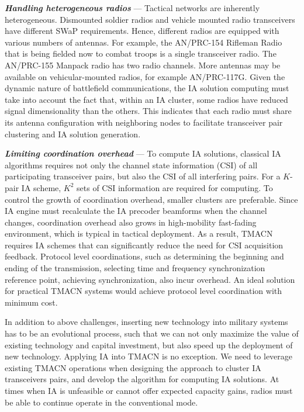 \documentclass[letterpaper,11pt]{article}
\begin{document}
{\textbf{\textit{Handling heterogeneous radios}}} ---  Tactical networks are inherently heterogeneous. Dismounted soldier radios and vehicle mounted radio transceivers have different SWaP requirements. Hence, different radios are equipped with various numbers of antennas. For example, the AN/PRC-154 Rifleman Radio that is being fielded now to combat troops is a single transceiver radio. The AN/PRC-155 Manpack radio has two radio channels. More antennas may be available on vehicular-mounted radios, for example AN/PRC-117G. Given the dynamic nature of battlefield communications, the IA solution computing must take into account the fact that, within an IA cluster, some radios have reduced signal dimensionality than the others. This indicates that each radio must share its antenna configuration with neighboring nodes to facilitate transceiver pair clustering and IA solution generation. 

{\textbf{\textit{Limiting coordination overhead}}} --- To compute IA solutions, classical IA algorithms requires not only the channel state information (CSI) of all participating transceiver pairs, but also the CSI of all interfering pairs. For a $K$-pair IA scheme, $K^2$ sets of CSI information are required for computing. To control the growth of coordination overhead, smaller clusters are preferable. Since IA engine must recalculate the IA precoder beamforms when the channel changes, coordination overhead also grows in high-mobility fast-fading environment, which is typical in tactical deployment. As a result, TMACN requires IA schemes that can significantly reduce the need for CSI acquisition feedback. Protocol level coordinations, such as determining the beginning and ending of the transmission, selecting time and frequency synchronization reference point, achieving synchronization, also incur overhead. An ideal solution for practical TMACN systems would achieve protocol level coordination with minimum cost.

In addition to above challenges, inserting new technology into military systems has to be an evolutional process, such that we can not only maximize the value of existing technology and capital investment, but also speed up the deployment of new technology. Applying IA into TMACN is no exception. We need to leverage existing TMACN operations when designing the approach to cluster IA transceivers pairs, and develop the algorithm for computing IA solutions. At times when IA is unfeasible or cannot offer expected capacity gains, radios must be able to continue operate in the conventional mode.
\end{document}
